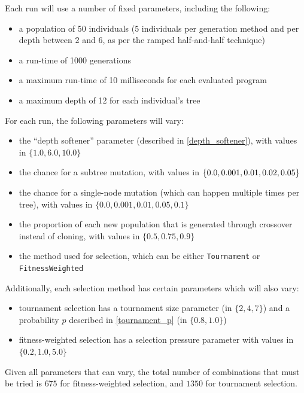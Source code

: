\documentclass{report}
\begin{document}
Each run will use a number of fixed parameters, including the following:

\begin{itemize}
    \item a population of 50 individuals (5 individuals per generation method and per depth between 2 and 6, as per the ramped half-and-half technique)
    \item a run-time of 1000 generations
    \item a maximum run-time of 10 milliseconds for each evaluated program
    \item a maximum depth of 12 for each individual's tree
\end{itemize}

For each run, the following parameters will vary:

\begin{itemize}
    \item the ``depth softener'' parameter (described in \autoref{depth_softener}), with values in $\{1.0, 6.0, 10.0\}$
    \item the chance for a subtree mutation, with values in $\{0.0, 0.001, 0.01, \linebreak 0.02, 0.05\}$
    \item the chance for a single-node mutation (which can happen multiple times per tree), with values in $\{0.0, 0.001, 0.01, 0.05, 0.1\}$
    \item the proportion of each new population that is generated through crossover instead of cloning, with values in $\{0.5, 0.75, 0.9\}$
    \item the method used for selection, which can be either \verb|Tournament| or \linebreak
    \verb|FitnessWeighted|
\end{itemize}

Additionally, each selection method has certain parameters which will also vary:

\begin{itemize}
    \item tournament selection has a tournament size parameter (in $\{2, 4, 7\}$) and a probability $p$ described in \autoref{tournament_p} (in $\{0.8, 1.0\}$)
    \item fitness-weighted selection has a selection pressure parameter with values in $\{0.2, 1.0, 5.0\}$
\end{itemize}

Given all parameters that can vary, the total number of combinations that must be tried is $675$ for fitness-weighted selection, and $1350$ for tournament selection.
\end{document}

